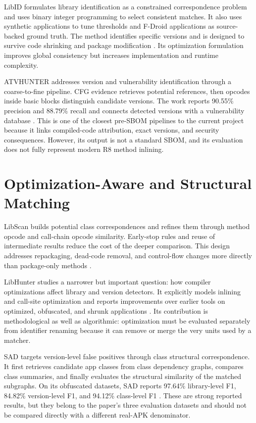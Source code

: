 LibID formulates library identification as a constrained correspondence
problem and uses binary integer programming to select consistent matches. It
also uses synthetic applications to tune thresholds and F-Droid applications
as source-backed ground truth. The method identifies specific versions and is
designed to survive code shrinking and package modification
\cite{zhang2019libid}. Its optimization formulation improves global
consistency but increases implementation and runtime complexity.

ATVHUNTER addresses version and vulnerability identification through a
coarse-to-fine pipeline. CFG evidence retrieves potential references, then
opcodes inside basic blocks distinguish candidate versions. The work reports
90.55\% precision and 88.79\% recall and connects detected versions with a
vulnerability database \cite{zhan2021atvhunter}. This is one of the closest
pre-SBOM pipelines to the current project because it links compiled-code
attribution, exact versions, and security consequences. However, its output is
not a standard SBOM, and its evaluation does not fully represent modern R8
method inlining.

\section{Optimization-Aware and Structural Matching}

LibScan builds potential class correspondences and refines them through method
opcode and call-chain opcode similarity. Early-stop rules and reuse of
intermediate results reduce the cost of the deeper comparison. This design
addresses repackaging, dead-code removal, and control-flow changes more
directly than package-only methods \cite{wu2023libscan}.

LibHunter studies a narrower but important question: how compiler
optimizations affect library and version detectors. It explicitly models
inlining and call-site optimization and reports improvements over earlier
tools on optimized, obfuscated, and shrunk applications
\cite{xie2024libhunter}. Its contribution is methodological as well as
algorithmic: optimization must be evaluated separately from identifier
renaming because it can remove or merge the very units used by a matcher.

SAD targets version-level false positives through class structural
correspondence. It first retrieves candidate app classes from class dependency
graphs, compares class summaries, and finally evaluates the structural
similarity of the matched subgraphs. On its obfuscated datasets, SAD reports
97.64\% library-level F1, 84.82\% version-level F1, and 94.12\% class-level F1
\cite{zhou2025sad}. These are strong reported results, but they belong to the
paper's three evaluation datasets and should not be compared directly with a
different real-APK denominator.

